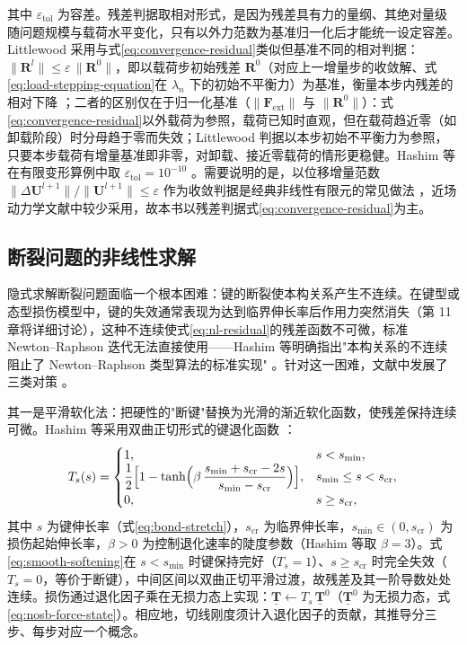 其中 $\varepsilon_{\mathrm{tol}}$ 为容差。残差判据取相对形式，是因为残差具有力的量纲、其绝对量级随问题规模与载荷水平变化，只有以外力范数为基准归一化后才能统一设定容差。Littlewood 采用与式\eqref{eq:convergence-residual}类似但基准不同的相对判据：$\lVert\mathbf{R}^{l}\rVert\le\varepsilon\,\lVert\mathbf{R}^{0}\rVert$，即以载荷步初始残差 $\mathbf{R}^{0}$（对应上一增量步的收敛解、式\eqref{eq:load-stepping-equation}在 $\lambda_{n}$ 下的初始不平衡力）为基准，衡量本步内残差的相对下降 \cite{Littlewood2015}；二者的区别仅在于归一化基准（$\lVert\mathbf{F}_{\mathrm{ext}}\rVert$ 与 $\lVert\mathbf{R}^{0}\rVert$）：式\eqref{eq:convergence-residual}以外载荷为参照，载荷已知时直观，但在载荷趋近零（如卸载阶段）时分母趋于零而失效；Littlewood 判据以本步初始不平衡力为参照，只要本步载荷有增量基准即非零，对卸载、接近零载荷的情形更稳健。Hashim 等在有限变形算例中取 $\varepsilon_{\mathrm{tol}}=10^{-10}$ \cite{Hashim2020}。需要说明的是，以位移增量范数 $\lVert\Delta\mathbf{U}^{l+1}\rVert/\lVert\mathbf{U}^{l+1}\rVert\le\varepsilon$ 作为收敛判据是经典非线性有限元的常见做法 \cite{BelytschkoLiuMoran2000}，近场动力学文献中较少采用，故本书以残差判据式\eqref{eq:convergence-residual}为主。

\subsection{断裂问题的非线性求解}\label{sec:nl-fracture}

隐式求解断裂问题面临一个根本困难：键的断裂使本构关系产生不连续。在键型或态型损伤模型中，键的失效通常表现为达到临界伸长率后作用力突然消失（第 11 章将详细讨论），这种不连续使式\eqref{eq:nl-residual}的残差函数不可微，标准 Newton--Raphson 迭代无法直接使用——Hashim 等明确指出"本构关系的不连续阻止了 Newton--Raphson 类型算法的标准实现" \cite{Hashim2020}。针对这一困难，文献中发展了三类对策 \cite{Hashim2020,Ni2019}。

其一是平滑软化法：把硬性的"断键"替换为光滑的渐近软化函数，使残差保持连续可微。Hashim 等采用双曲正切形式的键退化函数 \cite{Hashim2020}：
\begin{equation}
  T_{s}(s)=
  \begin{cases}
    1, & s<s_{\min},\\
    \dfrac{1}{2}\Bigl[1-\tanh\Bigl(\beta\,\dfrac{s_{\min}+s_{\mathrm{cr}}-2s}{s_{\min}-s_{\mathrm{cr}}}\Bigr)\Bigr], & s_{\min}\le s<s_{\mathrm{cr}},\\
    0, & s\ge s_{\mathrm{cr}},
  \end{cases}
  \label{eq:smooth-softening}
\end{equation}
其中 $s$ 为键伸长率（式\eqref{eq:bond-stretch}），$s_{\mathrm{cr}}$ 为临界伸长率，$s_{\min}\in(0,s_{\mathrm{cr}})$ 为损伤起始伸长率，$\beta>0$ 为控制退化速率的陡度参数（Hashim 等取 $\beta=3$）\cite{Hashim2020}。式\eqref{eq:smooth-softening}在 $s<s_{\min}$ 时键保持完好（$T_s=1$）、$s\ge s_{\mathrm{cr}}$ 时完全失效（$T_s=0$，等价于断键），中间区间以双曲正切平滑过渡，故残差及其一阶导数处处连续。损伤通过退化因子乘在无损力态上实现：$\underline{\mathbf{T}}\leftarrow T_{s}\,\underline{\mathbf{T}}^{0}$（$\underline{\mathbf{T}}^{0}$ 为无损力态，式\eqref{eq:nosb-force-state}）。相应地，切线刚度须计入退化因子的贡献，其推导分三步、每步对应一个概念。

